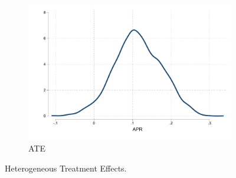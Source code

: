 \begin{appendix}
\begin{figure}
\begin{center}
\begin{subfigure}{.32\textwidth}
        \includegraphics[width=\textwidth]{Figuras/he_dist_tau_hat_eff.pdf}
        \caption{ATE}
    \end{subfigure} 
    \end{center}
    \caption{Heterogeneous Treatment Effects.}
    \label{heterogeneous_effects}    
\end{figure}

\begin{figure}[h!]
   

\end{figure}
\end{appendix}
